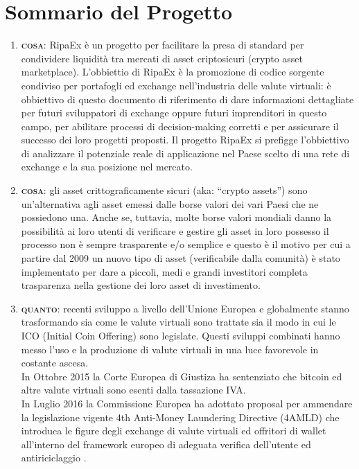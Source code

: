 \section{Sommario del Progetto}
\begin{enumerate}
	\item \textbf{\textsc{cosa}}: RipaEx è un progetto per facilitare la presa di standard per condividere liquidità tra mercati di asset
	criptosicuri (crypto asset marketplace).
	L'obbiettio di RipaEx è la promozione di codice sorgente condiviso per portafogli ed exchange nell'industria delle valute
	virtuali: è obbiettivo di questo documento di riferimento di dare informazioni dettagliate per futuri
	sviluppatori di exchange oppure futuri imprenditori in questo campo, per abilitare processi di decision-making corretti e per 
	assicurare il successo dei loro progetti proposti.
	Il progetto RipaEx si prefigge l'obbiettivo di analizzare il potenziale reale di applicazione nel Paese scelto 
	di una rete di exchange e la sua posizione nel mercato.
	\item \textbf{\textsc{cosa}}: gli asset crittograficamente sicuri (aka: ``crypto assets'') sono un'alternativa agli asset emessi dalle borse
	valori dei vari Paesi che ne possiedono una. Anche se, tuttavia, molte borse valori mondiali danno la possibilità ai loro 
	utenti di verificare e gestire gli asset in loro possesso il processo non è sempre trasparente e/o semplice e questo è il motivo 
	per cui a partire dal 2009 \cite{bitcoin} un nuovo tipo di asset (verificabile dalla comunità) è stato implementato
	per dare a piccoli, medi e grandi investitori completa trasparenza nella gestione dei loro asset di investimento.
	\item \textbf{\textsc{quanto}}: recenti sviluppo a livello dell'Unione Europea e globalmente stanno trasformando sia come le valute virtuali
	sono trattate sia il modo in cui le ICO (Initial Coin Offering) sono legislate. Questi sviluppi combinati hanno messo
	l'uso e la produzione di valute virtuali in una luce favorevole in costante ascesa. \\
	In Ottobre 2015 la Corte Europea di Giustiza ha sentenziato che bitcoin ed altre valute virtuali sono esenti dalla tassazione IVA. \\
	In Luglio 2016 la Commissione Europea ha adottato proposal per ammendare la legislazione vigente 4th Anti-Money Laundering Directive (4AMLD) 
	che introduca le figure degli exchange di valute virtuali ed offritori di wallet all'interno del framework europeo di adeguata verifica
	dell'utente ed antiriciclaggio \cite{EUAMLCrypto}.\\

\end{enumerate}
